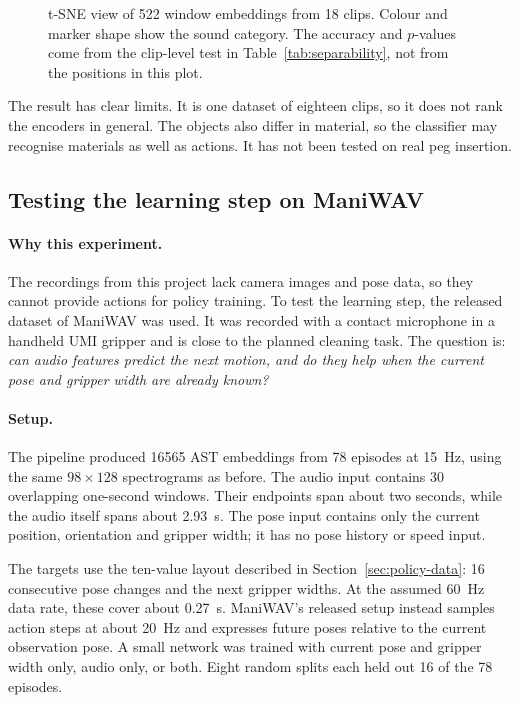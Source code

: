 \documentclass[
  english,
  accentcolor=11b,
  type=intern,
  marginpar=false,
  logofile=figures/PEARLTUDA.png
]{tudapub}
\DeclareRobustCommand{\code}[1]{\texttt{\detokenize{#1}}}
\begin{document}
\begin{figure}[htbp]
  \centering
  
  \caption{t-SNE \citep{vandermaaten2008tsne} view of 522 window embeddings from 18 clips. Colour and marker shape show the sound category. The accuracy and \(p\)-values come from the clip-level test in Table~\ref{tab:separability}, not from the positions in this plot.}
  \label{fig:home-embedding}
\end{figure}

The result has clear limits. It is one dataset of eighteen clips, so it does not rank the encoders in general. The objects also differ in material, so the classifier may recognise materials as well as actions. It has not been tested on real peg insertion.

\subsection{Testing the learning step on ManiWAV}
\label{sec:maniwav}

\paragraph{Why this experiment.} The recordings from this project lack camera images and pose data, so they cannot provide actions for policy training. To test the learning step, the released \code{wipe} dataset of ManiWAV \citep{liu2024maniwav} was used. It was recorded with a contact microphone in a handheld UMI gripper and is close to the planned cleaning task. The question is: \emph{can audio features predict the next motion, and do they help when the current pose and gripper width are already known?}

\paragraph{Setup.} The pipeline produced \num{16565} AST embeddings from 78 episodes at \SI{15}{\hertz}, using the same \(98\times128\) spectrograms as before. The audio input contains 30 overlapping one-second windows. Their endpoints span about two seconds, while the audio itself spans about \SI{2.93}{\second}. The pose input contains only the current position, orientation and gripper width; it has no pose history or speed input.

The targets use the ten-value layout described in Section~\ref{sec:policy-data}: 16 consecutive pose changes and the next gripper widths. At the assumed \SI{60}{\hertz} data rate, these cover about \SI{0.27}{\second}. ManiWAV's released setup instead samples action steps at about \SI{20}{\hertz} and expresses future poses relative to the current observation pose. A small network was trained with current pose and gripper width only, audio only, or both. Eight random splits each held out 16 of the 78 episodes.
\end{document}
